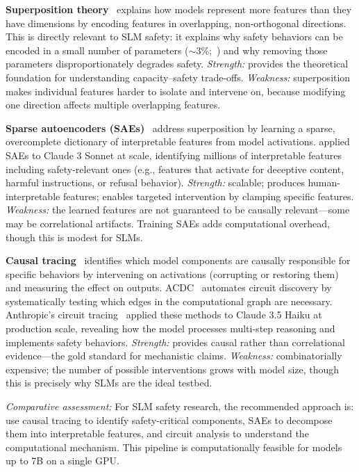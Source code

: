 \documentclass[12pt,a4paper]{article}
\begin{document}
\textbf{Superposition theory}~\citep{elhage2022superposition} explains how models represent more features than they have dimensions by encoding features in overlapping, non-orthogonal directions. This is directly relevant to SLM safety: it explains why safety behaviors can be encoded in a small number of parameters (${\sim}3\%$;~\citealp{wei2024brittleness}) and why removing those parameters disproportionately degrades safety. \emph{Strength:} provides the theoretical foundation for understanding capacity--safety trade-offs. \emph{Weakness:} superposition makes individual features harder to isolate and intervene on, because modifying one direction affects multiple overlapping features.

\textbf{Sparse autoencoders (SAEs)}~\citep{bricken2023monosemanticity,templeton2024scaling} address superposition by learning a sparse, overcomplete dictionary of interpretable features from model activations. \citet{templeton2024scaling} applied SAEs to Claude 3 Sonnet at scale, identifying millions of interpretable features including safety-relevant ones (e.g., features that activate for deceptive content, harmful instructions, or refusal behavior). \emph{Strength:} scalable; produces human-interpretable features; enables targeted intervention by clamping specific features. \emph{Weakness:} the learned features are not guaranteed to be causally relevant---some may be correlational artifacts. Training SAEs adds computational overhead, though this is modest for SLMs.

\textbf{Causal tracing}~\citep{meng2022rome,conmy2023acdc} identifies which model components are causally responsible for specific behaviors by intervening on activations (corrupting or restoring them) and measuring the effect on outputs. ACDC~\citep{conmy2023acdc} automates circuit discovery by systematically testing which edges in the computational graph are necessary. Anthropic's circuit tracing~\citep{lindsey2025biology} applied these methods to Claude 3.5 Haiku at production scale, revealing how the model processes multi-step reasoning and implements safety behaviors. \emph{Strength:} provides causal rather than correlational evidence---the gold standard for mechanistic claims. \emph{Weakness:} combinatorially expensive; the number of possible interventions grows with model size, though this is precisely why SLMs are the ideal testbed.

\emph{Comparative assessment:} For SLM safety research, the recommended approach is: use causal tracing to identify safety-critical components, SAEs to decompose them into interpretable features, and circuit analysis to understand the computational mechanism. This pipeline is computationally feasible for models up to 7B on a single GPU.
\end{document}
